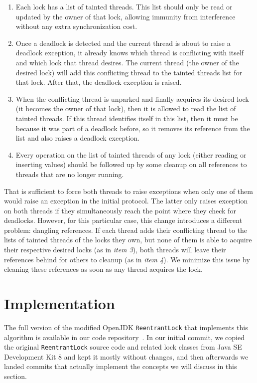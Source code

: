 \begin{enumerate}
\item Each lock has a list of tainted threads. This list should only be read or updated by the owner of that lock, allowing immunity from interference without any extra synchronization cost.
\item Once a deadlock is detected and the current thread is about to raise a deadlock exception, it already knows which thread is conflicting with itself and which lock that thread desires. The current thread (the owner of the desired lock) will add this conflicting thread to the tainted threads list for that lock. After that, the deadlock exception is raised.
\item When the conflicting thread is unparked and finally acquires its desired lock (it becomes the owner of that lock), then it is allowed to read the list of tainted threads. If this thread identifies itself in this list, then it must be because it was part of a deadlock before, so it removes its reference from the list and also raises a deadlock exception.
\item Every operation on the list of tainted threads of any lock (either reading or inserting values) should be followed up by some cleanup on all references to threads that are no longer running.
\end{enumerate}

That is sufficient to force both threads to raise exceptions when only one of them would raise an exception in the initial protocol. The latter only raises exception on both threads if they simultaneously reach the point where they check for deadlocks. However, for this particular case, this change introduces a different problem: dangling references.
If each thread adds their conflicting thread to the lists of tainted threads of the locks they own, 
but none of them is able to acquire their respective desired locks (as in \emph{item 3}),
both threads will leave their references behind for others to cleanup (as in \emph{item 4}).
We minimize this issue by cleaning these references as soon as any thread acquires the lock.

\section{Implementation}

The full version of the modified OpenJDK {\tt ReentrantLock} that implements this algorithm is available in our code repository~\citep{repo}.
In our initial commit, we copied the original {\tt ReentrantLock} source code and related lock classes from Java SE Development Kit 8 and kept it mostly without changes, and then afterwards we landed commits that actually implement the concepts we will discuss in this section. 

